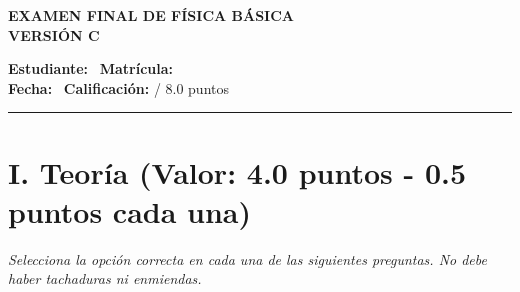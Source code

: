 \documentclass[11pt,a4paper]{article}
\begin{document}
\begin{center}
    \textbf{\Large EXAMEN FINAL DE FÍSICA BÁSICA} \\[0.2cm]
    \textbf{\large VERSIÓN C} \\[0.4cm]
\end{center}

\noindent \textbf{Estudiante:} \hrulefill \ \textbf{Matrícula:} \underline{\hspace{3cm}} \\[0.2cm]
\textbf{Fecha:} \underline{\hspace{4cm}} \ \textbf{Calificación:} \underline{\hspace{1.5cm}} / 8.0 puntos \\

\hrule
\section*{I. Teoría (Valor: 4.0 puntos - 0.5 puntos cada una)}
\textit{Selecciona la opción correcta en cada una de las siguientes preguntas. No debe haber tachaduras ni enmiendas.}
\end{document}

